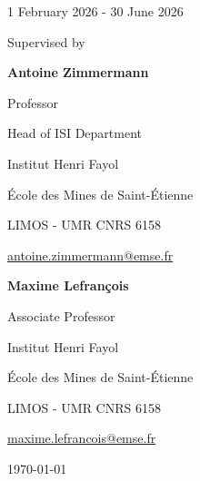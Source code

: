 \documentclass[11pt,a4paper,oneside]{report}
\begin{document}
\begin{titlepage}
  \vspace{0.15cm}
  {\small 1 February 2026 - 30 June 2026\par}
  \vspace{0.6cm}
{\small Supervised by\par}
\vspace{0.4cm}
\noindent
\begin{minipage}[t]{0.47\textwidth}
  \centering
  {\normalsize\textbf{Antoine Zimmermann}\par}
  \vspace{0.1cm}
  {\small Professor\par}
  {\small Head of ISI Department\par}
  {\small Institut Henri Fayol\par}
  {\small École des Mines de Saint-Étienne\par}
  {\small LIMOS - UMR CNRS 6158\par}
  \vspace{0.1cm}
  {\small \href{mailto:antoine.zimmermann@emse.fr}{antoine.zimmermann@emse.fr}\par}
\end{minipage}%
\hfill%
\begin{minipage}[t]{0.47\textwidth}
  \centering
  {\normalsize\textbf{Maxime Lefrançois}\par}
  \vspace{0.1cm}
  {\small Associate Professor\par}
  {\small Institut Henri Fayol\par}
  {\small École des Mines de Saint-Étienne\par}
  {\small LIMOS - UMR CNRS 6158\par}
  \vspace{0.1cm}
  {\small \href{mailto:maxime.lefrancois@emse.fr}{maxime.lefrancois@emse.fr}\par}
\end{minipage}
  \vfill
  {\normalsize \today\par}
\end{titlepage}
\clearpage

\clearpage

\par\vspace{2em}
\vspace{1em}
\clearpage
\tableofcontents
\clearpage
{}







\printbibliography[title={References}]
\end{document}
